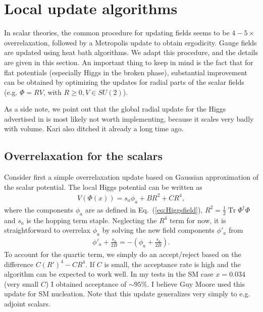 \documentclass[11pt,a4paper]{article}
\newcommand\Tr{\operatorname{Tr}}
\newcommand\lauri[1]{{\color{myorange}#1}}
\begin{document}
\section{Local update algorithms}

In scalar theories, the common procedure for updating fields seems to be $4-5 \times $overrelaxation, followed by a Metropolis update to obtain ergodicity. Gauge fields are updated using heat bath algorithms. We adapt this procedure, and the details are given in this section. An important thing to keep in mind is the fact that for flat potentials (especially Higgs in the broken phase), substantial improvement can be obtained by optimizing the updates for radial parts of the scalar fields (e.g. $\Phi = R V$, with $R \geq 0, V \in SU(2)$). 

As a side note, we point out that the global radial update for the Higgs advertised in \cite{Kajantie:1995kf} is most likely not worth implementing, because it scales very badly with volume. \lauri{Kari also ditched it already a long time ago.}

\subsection{Overrelaxation for the scalars}

Consider first a simple overrelaxation update based on Gaussian approximation of the scalar potential. The local Higgs potential can be written as 
\begin{align}
V(\Phi(x)) = s_a \phi_a + B R^2 + C R^4,
\end{align}
where the components $\phi_a$ are as defined in Eq.~(\ref{eq:Higgsfield}), $R^2 = \frac12 \Tr\Phi^\dagger\Phi$ and $s_a$ is the hopping term staple. Neglecting the $R^4$ term for now, it is straightforward to overrelax $\phi_a$ by solving the new field components $\phi'_a$ from
\begin{align}
\phi'_a + \frac{s_a}{2B} = -(\phi_a + \frac{s_a}{2B}).
\end{align}
To account for the quartic term, we simply do an accept/reject based on the difference $C (R')^4 - C R^4$. If $C$ is small, the acceptance rate is high and the algorithm can be expected to work well. In my tests in the SM case $x=0.034$ (very small $C$) I obtained acceptance of $\sim 95\%$. \lauri{I believe Guy Moore used this update for SM nucleation.} Note that this update generalizes very simply to e.g. adjoint scalars.
\end{document}
